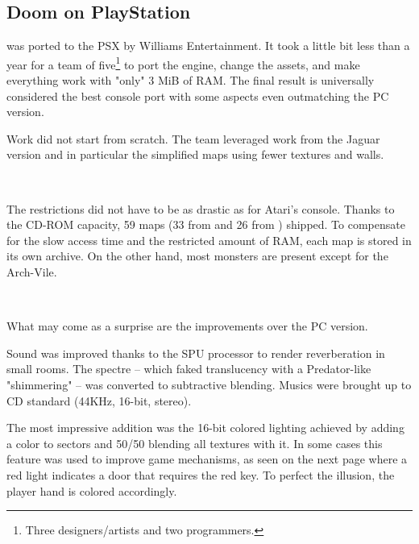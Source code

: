 \subsection{Doom on PlayStation}
\doom{} was ported to the PSX by Williams Entertainment. It took a little bit less than a year for a team of five\footnote{Three designers/artists and two programmers.} to port the engine, change the assets, and make everything work with "only" 3 MiB of RAM. The final result is universally considered the best console port with some aspects even outmatching the PC version.\\
\par
Work did not start from scratch. The team leveraged work from the Jaguar version and in particular the simplified maps using fewer textures and walls.\\
\par
{}\\
\par
  The restrictions did not have to be as drastic as for Atari's console. Thanks to the CD-ROM capacity, 59 maps (33 from \doom{} and 26 from \doomii{}) shipped. To compensate for the slow access time and the restricted amount of RAM, each map is stored in its own  archive. On the other hand, most monsters are present except for the Arch-Vile.\\
\par
{}\\
\par
What may come as a surprise are the improvements over the PC version.\\
\par
Sound was improved thanks to the SPU processor to render reverberation in small rooms. The spectre -- which faked translucency with a Predator-like "shimmering" -- was converted to subtractive blending. Musics were brought up to CD standard (44KHz, 16-bit, stereo).\\
\par
 The most impressive addition was the 16-bit colored lighting achieved by adding a color to sectors and 50/50 blending all textures with it. In some cases this feature was used to improve game mechanisms, as seen on the next page where a red light indicates a door that requires the red key. To perfect the illusion, the player hand is colored accordingly.\\
\par


